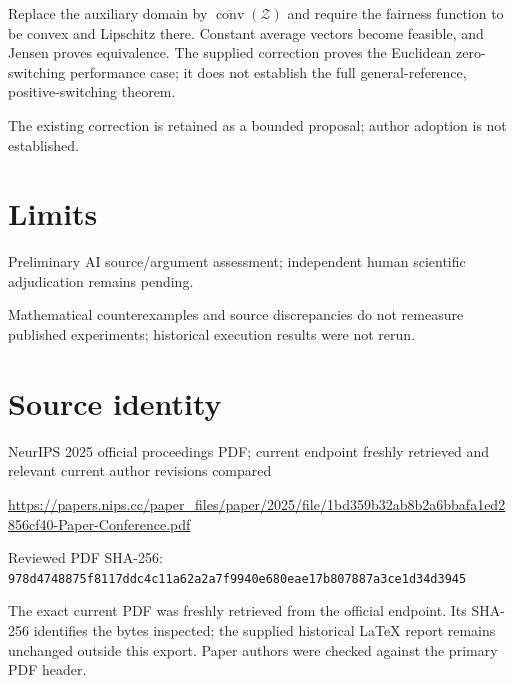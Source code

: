 \documentclass[11pt]{article}
\begin{document}
Replace the auxiliary domain by \(\overline{\operatorname{conv}}(\mathcal Z)\) and require the fairness function to be convex and Lipschitz there. Constant average vectors become feasible, and Jensen proves equivalence. The supplied correction proves the Euclidean zero-switching performance case; it does not establish the full general-reference, positive-switching theorem.

The existing correction is retained as a bounded proposal; author adoption is not established.

\section*{Limits}

Preliminary AI source/argument assessment; independent human scientific adjudication remains pending.\par

Mathematical counterexamples and source discrepancies do not remeasure published experiments; historical execution results were not rerun.\par

\section*{Source identity}

NeurIPS 2025 official proceedings PDF; current endpoint freshly retrieved and relevant current author revisions compared

\url{https://papers.nips.cc/paper_files/paper/2025/file/1bd359b32ab8b2a6bbafa1ed2856cf40-Paper-Conference.pdf}

Reviewed PDF SHA-256: \nolinkurl{978d4748875f8117ddc4c11a62a2a7f9940e680eae17b807887a3ce1d34d3945}

The exact current PDF was freshly retrieved from the official endpoint. Its SHA-256 identifies the bytes inspected; the supplied historical LaTeX report remains unchanged outside this export. Paper authors were checked against the primary PDF header.
\end{document}
